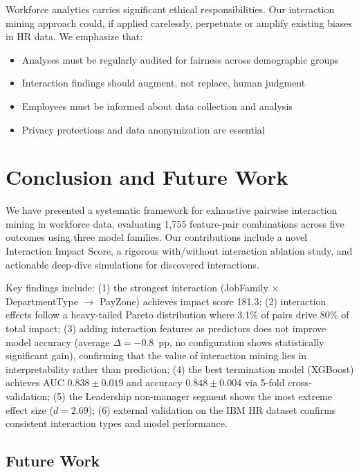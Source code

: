 \documentclass[twocolumn]{article}
\begin{document}
Workforce analytics carries significant ethical responsibilities. Our interaction mining approach could, if applied carelessly, perpetuate or amplify existing biases in HR data. We emphasize that:

\begin{itemize}
    \item Analyses must be regularly audited for fairness across demographic groups
    \item Interaction findings should augment, not replace, human judgment
    \item Employees must be informed about data collection and analysis
    \item Privacy protections and data anonymization are essential
\end{itemize}

\section{Conclusion and Future Work}
\label{sec:conclusion}

We have presented a systematic framework for exhaustive pairwise interaction mining in workforce data, evaluating 1,755 feature-pair combinations across five outcomes using three model families. Our contributions include a novel Interaction Impact Score, a rigorous with/without interaction ablation study, and actionable deep-dive simulations for discovered interactions.

Key findings include: (1) the strongest interaction (JobFamily $\times$ DepartmentType $\to$ PayZone) achieves impact score 181.3; (2) interaction effects follow a heavy-tailed Pareto distribution where 3.1\% of pairs drive 80\% of total impact; (3) adding interaction features as predictors does not improve model accuracy (average $\Delta = -0.8$~pp, no configuration shows statistically significant gain), confirming that the value of interaction mining lies in interpretability rather than prediction; (4) the best termination model (XGBoost) achieves AUC $0.838\pm0.019$ and accuracy $0.848\pm0.004$ via 5-fold cross-validation; (5) the Leadership non-manager segment shows the most extreme effect size ($d = 2.69$); (6) external validation on the IBM HR dataset confirms consistent interaction types and model performance.

\subsection{Future Work}
\end{document}
